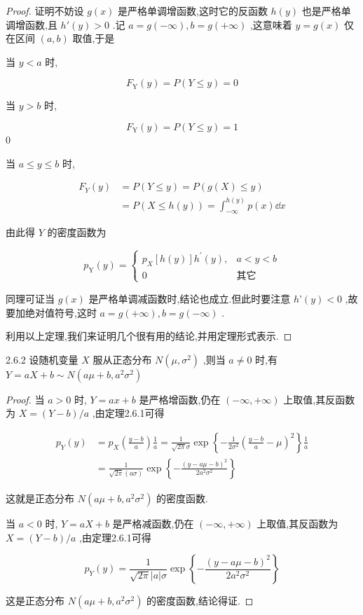 \begin{proof}
	证明不妨设 $ g(x) $ 是严格单调增函数,这时它的反函数 $ h(y) $ 也是严格单调增函数,且 $ h'(y)>0 $ .记 $ a=g(-\infty), b=g(+\infty) $ ,这意味着 $ y=g(x) $ 仅在区间 $ (a,b) $ 取值,于是
	
	当 $ y<a $ 时,
	
	\[
	F_{\mathrm{Y}}(y)=P(Y \leqslant y)=0
	\]
	
	当 $ y>b $ 时,
	
	\[
	F_{\mathrm{Y}}(y)=P(Y \leqslant y)=1
	\]0
	
	当 $ a \leqslant y \leqslant b $ 时,
	
	\[
	\begin{aligned} F_{Y}(y) &=P(Y \leqslant y)=P(g(X) \leqslant y) \\ &=P(X \leqslant h(y))=\int_{-\infty}^{h(y)} p(x) \dd x \end{aligned}
	\]
	
	由此得 $ Y $ 的密度函数为
	
	\[
	p_{\mathrm{Y}}(y)=\left\{
	\begin{array}{ll}
	{p_{X}[h(y)] h^{\prime}(y), } & {a<y<b} \\ 
	{0} & {\text{其它}}
	\end{array}\right.
	\]
	
	同理可证当 $ g(x) $ 是严格单调减函数时,结论也成立.但此时要注意 $ h’(y)<0 $ ,故要加绝对值符号,这时 $ a=g(+\infty), b=g(-\infty) $ .
	
	利用以上定理,我们来证明几个很有用的结论,并用定理形式表示.
\end{proof}

\begin{theorem}{}{2.6.2}
	设随机变量 $ X $ 服从正态分布 $ N\left(\mu, \sigma^{2}\right) $ ,则当 $ a \neq 0 $ 时,有 $ Y= aX+b \sim N\left(a \mu+b, a^{2} \sigma^{2}\right) $ 
\end{theorem}

\begin{proof}
	当 $ a>0 $ 时, $ Y=ax+b $ 是严格增函数,仍在 $ (-\infty,+\infty) $ 上取值,其反函数为 $ X=(Y-b)/a $ ,由定理2.6.1可得
	
	\[
	\begin{aligned} 
	p_{Y}(y) &=p_{X}\left(\frac{y-b}{a}\right) \frac{1}{a}=\frac{1}{\sqrt{2 \pi} \sigma} \exp \left\{-\frac{1}{2 \sigma^{2}}\left(\frac{y-b}{a}-\mu\right)^{2}\right\} \frac{1}{a} \\ 
	&=\frac{1}{\sqrt{2 \pi}(a \sigma)} \exp \left\{-\frac{(y-a \mu-b)^{2}}{2 a^{2} \sigma^{2}}\right\} 
	\end{aligned}
	\]
	
	这就是正态分布 $ N\left(a \mu+b, a^{2} \sigma^{2}\right) $ 的密度函数.
	
	当 $ a<0 $ 时, $ Y=aX+b $ 是严格减函数,仍在 $ (-\infty,+\infty) $ 上取值,其反函数为 $ X=(Y-b)/a $ ,由定理2.6.1可得
	
	\[
	p_{Y}(y)=\frac{1}{\sqrt{2 \pi}|a| \sigma} \exp \left\{-\frac{(y-a \mu-b)^{2}}{2 a^{2} \sigma^{2}}\right\}
	\]
	
	这是正态分布 $ N\left(a \mu+b, a^{2} \sigma^{2}\right) $ 的密度函数,结论得证.
	
\end{proof}

